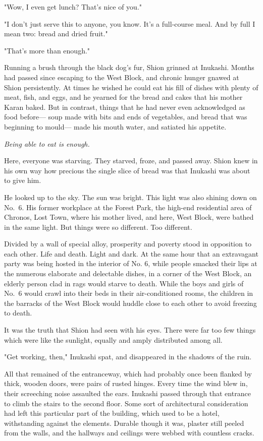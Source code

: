 "Wow, I even get lunch? That's nice of you."

"I don't just serve this to anyone, you know. It's a full-course meal.
And by full I mean two: bread and dried fruit."

"That's more than enough."

Running a brush through the black dog's fur, Shion grinned at Inukashi.
Months had passed since escaping to the West Block, and chronic hunger
gnawed at Shion persistently. At times he wished he could eat his fill
of dishes with plenty of meat, fish, and eggs, and he yearned for the
bread and cakes that his mother Karan baked. But in contrast, things
that he had never even acknowledged as food before--- soup made with bits
and ends of vegetables, and bread that was beginning to mould--- made his
mouth water, and satiated his appetite.

\emph{Being able to eat is enough.}

Here, everyone was starving. They starved, froze, and passed away. Shion
knew in his own way how precious the single slice of bread was that
Inukashi was about to give him.

He looked up to the sky. The sun was bright. This light was also shining
down on No.~6. His former workplace at the Forest Park, the high-end
residential area of Chronos, Lost Town, where his mother lived, and
here, West Block, were bathed in the same light. But things were so
different. Too different.

Divided by a wall of special alloy, prosperity and poverty stood in
opposition to each other. Life and death. Light and dark. At the same
hour that an extravagant party was being hosted in the interior of No.
6, while people smacked their lips at the numerous elaborate and
delectable dishes, in a corner of the West Block, an elderly person clad
in rags would starve to death. While the boys and girls of No.~6 would
crawl into their beds in their air-conditioned rooms, the children in
the barracks of the West Block would huddle close to each other to avoid
freezing to death.

It was the truth that Shion had seen with his eyes. There were far too
few things which were like the sunlight, equally and amply distributed
among all.

"Get working, then," Inukashi spat, and disappeared in the shadows of
the ruin.

\mybreak 
All that remained of the entranceway, which had probably once been
flanked by thick, wooden doors, were pairs of rusted hinges. Every time
the wind blew in, their screeching noise assaulted the ears. Inukashi
passed through that entrance to climb the stairs to the second floor.
Some sort of architectural consideration had left this particular part
of the building, which used to be a hotel, withstanding against the
elements. Durable though it was, plaster still peeled from the walls,
and the hallways and ceilings were webbed with countless cracks.

